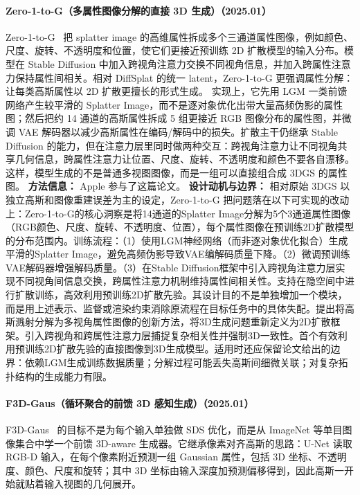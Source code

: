 \paragraph{Zero-1-to-G（多属性图像分解的直接 3D 生成）（2025.01）}
Zero-1-to-G~\cite{2501_05427} 把 splatter image 的高维属性拆成多个三通道属性图像，例如颜色、尺度、旋转、不透明度和位置，使它们更接近预训练 2D 扩散模型的输入分布。模型在 Stable Diffusion 中加入跨视角注意力交换不同视角信息，并加入跨属性注意力保持属性间相关。相对 DiffSplat 的统一 latent，Zero-1-to-G 更强调属性分解：让每类高斯属性以 2D 扩散更擅长的形式生成。
实现上，它先用 LGM 一类前馈网络产生较平滑的 Splatter Image，而不是逐对象优化出带大量高频伪影的属性图；然后把约 14 通道的高斯属性拆成 5 组更接近 RGB 图像分布的属性图，并微调 VAE 解码器以减少高斯属性在编码/解码中的损失。扩散主干仍继承 Stable Diffusion 的能力，但在注意力层里同时做两种交互：跨视角注意力让不同视角共享几何信息，跨属性注意力让位置、尺度、旋转、不透明度和颜色不要各自漂移。这样，模型生成的不是普通多视图图像，而是一组可以直接组合成 3DGS 的属性图。
\textbf{方法信息：} Apple 参与了这篇论文。
\textbf{设计动机与边界：} 相对原始 3DGS 以独立高斯和图像重建误差为主的设定，Zero-1-to-G 把问题落在以下可实现的改动上：Zero-1-to-G的核心洞察是将14通道的Splatter Image分解为5个3通道属性图像（RGB颜色、尺度、旋转、不透明度、位置），每个属性图像在预训练2D扩散模型的分布范围内。训练流程：（1）使用LGM神经网络（而非逐对象优化拟合）生成平滑的Splatter Image，避免高频伪影导致VAE编解码质量下降。（2）微调预训练VAE解码器增强解码质量。（3）在Stable Diffusion框架中引入跨视角注意力层实现不同视角间信息交换，跨属性注意力机制维持属性间相关性。支持在隐空间中进行扩散训练，高效利用预训练2D扩散先验。其设计目的不是单独增加一个模块，而是用上述表示、监督或渲染约束消除原流程在目标任务中的具体失配。提出将高斯溅射分解为多视角属性图像的创新方法，将3D生成问题重新定义为2D扩散框架。引入跨视角和跨属性注意力层捕捉复杂相关性并强制3D一致性。首个有效利用预训练2D扩散先验的直接图像到3D生成模型。适用时还应保留论文给出的边界：依赖LGM生成训练数据质量；分解过程可能丢失高斯间细微关联；对复杂拓扑结构的生成能力有限。
\paragraph{F3D-Gaus（循环聚合的前馈 3D 感知生成）（2025.01）}
F3D-Gaus~\cite{2501_06714} 的目标不是为每个输入单独做 SDS 优化，而是从 ImageNet 等单目图像集合中学一个前馈 3D-aware 生成器。它继承像素对齐高斯的思路：U-Net 读取 RGB-D 输入，在每个像素附近预测一组 Gaussian 属性，包括 3D 坐标、不透明度、颜色、尺度和旋转；其中 3D 坐标由输入深度加预测偏移得到，因此高斯一开始就贴着输入视图的几何展开。

